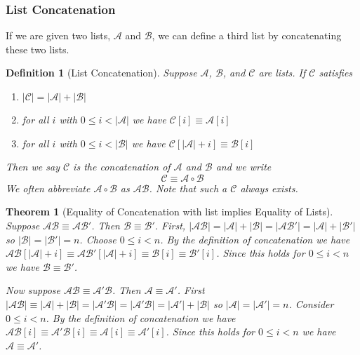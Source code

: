 \documentclass[12pt]{article}
\theoremstyle{break}
\newtheorem{definition}{Definition}[section]
\theoremstyle{break}
\newtheorem{theorem}{Theorem}[section]
\theoremstyle{break}
\theoremstyle{break}
\newcommand{\mc}[1]{\mathcal{#1}}
\begin{document}
\subsubsection{List Concatenation}
If we are given two lists, $\mc{A}$ and $\mc{B}$, we can define a third list by concatenating these two lists.

\begin{definition}[List Concatenation]
Suppose $\mc{A}$, $\mc{B}$, and $\mc{C}$ are lists.
If $\mc{C}$ satisfies
\begin{enumerate}
\item{$|\mc{C}| = |\mc{A}| + |\mc{B}|$}
\item{for all $i$ with $0 \le i < |\mc{A}|$ we have $\mc{C}[i] \equiv \mc{A}[i]$}
\item{for all $i$ with $0 \le i < |\mc{B}|$ we have $\mc{C}[|\mc{A}| + i] \equiv \mc{B}[i]$}
\end{enumerate}
Then we say $\mc{C}$ is the concatenation of $\mc{A}$ and $\mc{B}$ and we write
$$
\mc{C} \equiv \mc{A}\circ \mc{B}
$$
We often abbreviate $\mc{A}\circ\mc{B}$ as $\mc{A}\mc{B}$.
Note that such a $\mc{C}$ always exists.
\end{definition}

\begin{theorem}[Equality of Concatenation with list implies Equality of Lists]
Suppose $\mc{A}\mc{B} \equiv \mc{A}\mc{B}'$. 
Then $\mc{B} \equiv \mc{B}'$.
First, $|\mc{A}\mc{B}| = |\mc{A}| + |\mc{B}| = |\mc{A}\mc{B}'| = |\mc{A}| + |\mc{B}'|$ so $|\mc{B}| = |\mc{B}'| = n$.
Choose $0\le i < n$.
By the definition of concatenation we have $\mc{A}\mc{B}[|\mc{A}| + i] \equiv \mc{A}\mc{B}'[|\mc{A}| + i] \equiv \mc{B}[i] \equiv \mc{B}'[i]$.
Since this holds for $0\le i < n$ we have $\mc{B} \equiv \mc{B}'$.

Now suppose $\mc{A}\mc{B}\equiv \mc{A}'\mc{B}$. Then $\mc{A}\equiv \mc{A}'$.
First $|\mc{A}\mc{B}| \equiv |\mc{A}| + |\mc{B}| = |\mc{A}'\mc{B}| = |\mc{A}'\mc{B}| = |\mc{A}'| + |\mc{B}|$ so $|\mc{A}| = |\mc{A}'| = n$. Consider $0\le i < n$.
By the definition of concatenation we have $\mc{A}\mc{B}[i] \equiv \mc{A}'\mc{B}[i] \equiv \mc{A}[i] \equiv \mc{A}'[i]$.
Since this holds for $0 \le i < n$ we have $\mc{A} \equiv \mc{A}'$.


\end{theorem}
\end{document}
